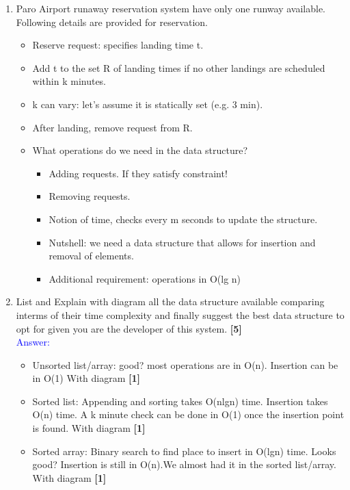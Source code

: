 \documentclass[12pt ,a4paper]{exam}
\begin{document}
\begin{enumerate}[start=1,label={\bfseries Q\arabic*)}]
        	\vspace{0.9mm}
       \newpage
      \pagebreak
      \pagebreak
    		\item Paro Airport runaway reservation system have only one runway available. Following details are provided for reservation. 
    	\begin{itemize}
    		\item Reserve request: specifies landing time t.
    		\item Add t to the set R of landing times if no other landings are
    		scheduled within k minutes.
    		\item k can vary: let’s assume it is statically set (e.g. 3 min). 
    		\item After landing, remove request from R.
    		\item What operations do we need in the data structure?
    		\begin{itemize}
    			\item Adding requests. If they satisfy constraint!
    			\item Removing requests.
    			\item Notion of time, checks every m seconds to update the structure.
    			\item Nutshell: we need a data structure that allows for insertion and removal of elements.
    			\item Additional requirement: operations in O(lg n)
    		\end{itemize}
    	\end{itemize}
    	\item [] List and Explain with diagram all the data structure available comparing interms of their time complexity and finally suggest the best data structure to opt for given you are the developer of this system.  \hfill\textbf{[5]}\\
    	\textcolor{blue}{Answer: } 
    	\begin{itemize}
    		\item Unsorted list/array: good? most operations are in O(n). Insertion can be in O(1) With diagram \hfill\textbf{[1]}\\
    		\item Sorted list: Appending and sorting takes O(nlgn) time. Insertion takes O(n) time.  A k minute check can be done in O(1) once the insertion point is found. With diagram \hfill\textbf{[1]}\\
    		\item Sorted array: Binary search to find place to insert in O(lgn) time. Looks good? Insertion is still in O(n).We almost had it in the sorted list/array. With diagram \hfill\textbf{[1]}\\

\end{itemize}
\end{enumerate}
\end{document}
